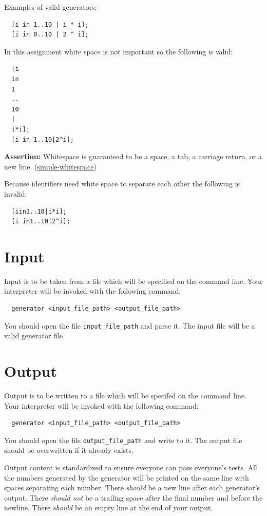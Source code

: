 \documentclass{article}
\newcommand{\code}[1]{\texttt{\textmd{#1}}}
\newcommand{\assertion}[2]{\textbf{Assertion: }#1 (\hyperlink{#2}{#2})}
\begin{document}
Examples of valid generators:
\begin{lstlisting}
  [i in 1..10 | i * i];
  [i in 0..10 | 2 ^ i];
\end{lstlisting}

In this assignment white space is not important so the following is valid:

\begin{lstlisting}
  [i
  in
  1
  ..
  10
  |
  i*i];
  [i in 1..10|2^i];
\end{lstlisting}

\assertion{Whitespace is guaranteed to be a space, a tab, a carriage return, or a new
line.}{simple-whitespace}

Because identifiers need white space to separate each other the following is invalid:
\begin{lstlisting}
  [iin1..10|i*i];
  [i in1..10|2^i];
\end{lstlisting}

\section{Input}
Input is to be taken from a file which will be specified on the command line. Your interpreter
will be invoked with the following command:
\begin{lstlisting}
  generator <input_file_path> <output_file_path>
\end{lstlisting}
You should open the file \code{input\_file\_path} and parse it. The input file will be a valid
generator file.

\section{Output}
Output is to be written to a file which will be specifed on the command line. Your interpreter
will be invoked with the following command:
\begin{lstlisting}
  generator <input_file_path> <output_file_path>
\end{lstlisting}
You should open the file \code{output\_file\_path} and write to it. The output file should be
overwritten if it already exists.

Output content is standardized to ensure everyone can pass everyone's tests. All the numbers
generated by the generator will be printed on the same line with spaces separating each number.
There \textit{should} be a new line after each generator's output. There \textit{should not} be a
trailing space after the final number and before the newline. There \textit{should} be an empty
line at the end of your output.
\end{document}
